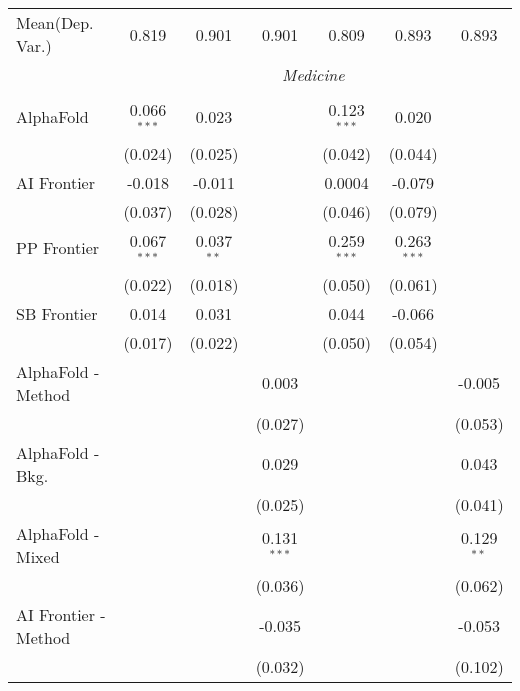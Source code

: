 \begin{tabular}{lcccccc}
Mean(Dep. Var.) & 0.819 & 0.901 & 0.901 & 0.809 & 0.893 & 0.893 \\
 & \multicolumn{6}{c}{\textit{Medicine}} \\ \\
   AlphaFold            & 0.066$^{***}$ & 0.023        &               & 0.123$^{***}$ & 0.020         &   \\   
                        & (0.024)       & (0.025)      &               & (0.042)       & (0.044)       &   \\   
   AI Frontier          & -0.018        & -0.011       &               & 0.0004        & -0.079        &   \\   
                        & (0.037)       & (0.028)      &               & (0.046)       & (0.079)       &   \\   
   PP Frontier          & 0.067$^{***}$ & 0.037$^{**}$ &               & 0.259$^{***}$ & 0.263$^{***}$ &   \\   
                        & (0.022)       & (0.018)      &               & (0.050)       & (0.061)       &   \\   
   SB Frontier          & 0.014         & 0.031        &               & 0.044         & -0.066        &   \\   
                        & (0.017)       & (0.022)      &               & (0.050)       & (0.054)       &   \\   
   AlphaFold - Method   &               &              & 0.003         &               &               & -0.005\\   
                        &               &              & (0.027)       &               &               & (0.053)\\   
   AlphaFold - Bkg.     &               &              & 0.029         &               &               & 0.043\\   
                        &               &              & (0.025)       &               &               & (0.041)\\   
   AlphaFold - Mixed    &               &              & 0.131$^{***}$ &               &               & 0.129$^{**}$\\   
                        &               &              & (0.036)       &               &               & (0.062)\\   
   AI Frontier - Method &               &              & -0.035        &               &               & -0.053\\   
                        &               &              & (0.032)       &               &               & (0.102)\\   

\end{tabular}
